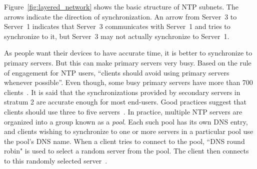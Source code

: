 Figure~\ref{fig:layered_network} shows the basic structure of NTP subnets. The
arrows indicate the direction of synchronization. An arrow from Server~3 to
Server~1 indicates that Server~3 communicates with Server~1 and tries to
synchronize to it, but Server~3 may not actually synchronize to Server~1.



As people want their devices to have accurate time, it is better to synchronize to
primary servers. But this can make primary servers very busy. Based on the rule
of engagement for NTP users, ``clients should avoid using primary servers
whenever possible''. Even though, some busy primary servers have more than 700
clients~\cite{rules}. 
It is said that the synchronizations provided by secondary servers in stratum 2
are accurate enough for most end-users. Good practices suggest that clients
should use three to five servers~\cite{rules}. 
In practice, multiple NTP servers are organized into a group known as a
\emph{pool}. Each such pool has its own DNS entry, and clients wishing to
synchronize to one or more servers in a particular pool use the pool's DNS
name. When a client tries to connect to the pool, ``DNS round robin" is used to
select a random server from the pool. The client then connects to this randomly
selected server~\cite{pool}.



